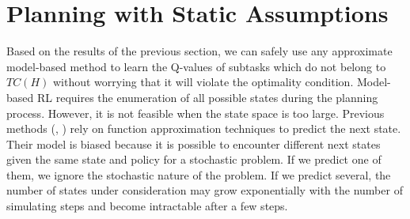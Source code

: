 





\section{Planning with Static Assumptions}
\label{se:Model}

Based on the results of the previous section, we can safely use any approximate model-based method 
to learn the Q-values of subtasks which do not belong to $TC(H)$ without worrying
that it will violate the optimality condition. Model-based RL requires the enumeration of all possible states during the planning process.
However, it is not feasible when the state space is too large.
Previous methods (\cite{ApproxDyna}, \cite{ApproxTree}) rely on function approximation
techniques to predict the next state. Their model is biased because it is possible 
to encounter different next states given the same state and policy for a stochastic problem. If we 
predict one of them, we ignore the stochastic nature of the problem. If we predict
several, the number of states under consideration may grow exponentially with the number of simulating steps
and become intractable after a few steps.

